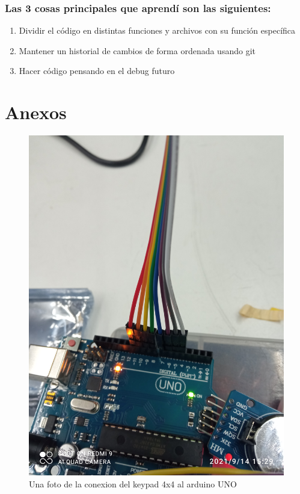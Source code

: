 \documentclass{article}
\begin{document}
		\subsubsection{Las 3 cosas principales que aprendí son las siguientes:}
		\begin{enumerate}
			\item Dividir el código en distintas funciones y archivos con su función específica
			\item Mantener un historial de cambios de forma ordenada usando git
			\item Hacer código pensando en el debug futuro
		\end{enumerate}



\section{Anexos}
\begin{figure}[H]
	\includegraphics[width=\textwidth]{anexos/anexo_1.jpg}
	\centering
	\caption{Una foto de la conexion del keypad 4x4 al arduino UNO}
\end{figure}
\end{document}
